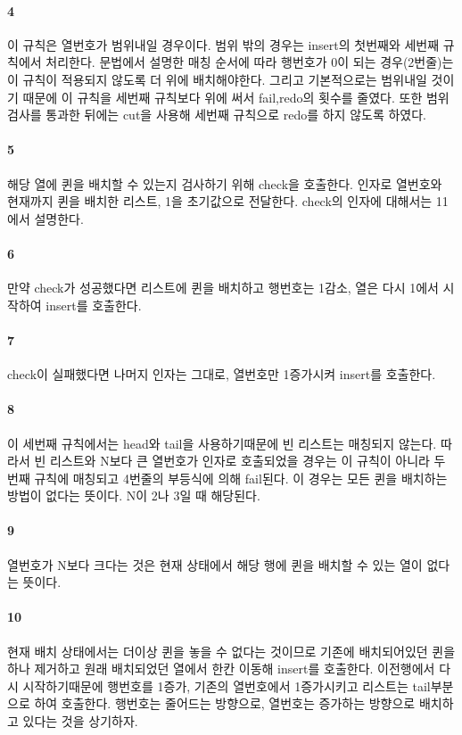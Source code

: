 \documentclass{oblivoir}
\begin{document}
\paragraph*{4}
이 규칙은 열번호가 범위내일 경우이다. 범위 밖의 경우는 insert의 첫번째와 세번째 규칙에서 처리한다. 문법에서 설명한 매칭 순서에 따라 행번호가 0이 되는 경우(2번줄)는 이 규칙이 적용되지 않도록 더 위에 배치해야한다. 그리고 기본적으로는 범위내일 것이기 때문에 이 규칙을 세번째 규칙보다 위에 써서 fail,redo의 횟수를 줄였다. 또한 범위 검사를 통과한 뒤에는 cut을 사용해 세번째 규칙으로 redo를 하지 않도록 하였다.

\paragraph*{5}
해당 열에 퀸을 배치할 수 있는지 검사하기 위해 check을 호출한다. 인자로 열번호와 현재까지 퀸을 배치한 리스트, 1을 초기값으로 전달한다. check의 인자에 대해서는 11에서 설명한다.

\paragraph*{6}
만약 check가 성공했다면 리스트에 퀸을 배치하고 행번호는 1감소, 열은 다시 1에서 시작하여 insert를 호출한다.

\paragraph*{7}
check이 실패했다면 나머지 인자는 그대로, 열번호만 1증가시켜 insert를 호출한다.

\paragraph*{8}
이 세번째 규칙에서는 head와 tail을 사용하기때문에 빈 리스트는 매칭되지 않는다. 따라서 빈 리스트와 N보다 큰 열번호가 인자로 호출되었을 경우는 이 규칙이 아니라 두번째 규칙에 매칭되고 4번줄의 부등식에 의해 fail된다. 이 경우는 모든 퀸을 배치하는 방법이 없다는 뜻이다. N이 2나 3일 때 해당된다.

\paragraph*{9}
열번호가 N보다 크다는 것은 현재 상태에서 해당 행에 퀸을 배치할 수 있는 열이 없다는 뜻이다. 

\paragraph*{10}
현재 배치 상태에서는 더이상 퀸을 놓을 수 없다는 것이므로 기존에 배치되어있던 퀸을 하나 제거하고 원래 배치되었던 열에서 한칸 이동해 insert를 호출한다. 이전행에서 다시 시작하기때문에 행번호를 1증가, 기존의 열번호에서 1증가시키고 리스트는 tail부분으로 하여 호출한다. 행번호는 줄어드는 방향으로, 열번호는 증가하는 방향으로 배치하고 있다는 것을 상기하자.
\end{document}
